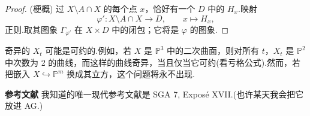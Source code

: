 \begin{proof}
(梗概) 过 $X \setminus A \cap X$ 的每个点 $x$，恰好有一个 $D$ 中的 $H_x$.映射
\[
\varphi' \colon X \setminus A \cap X \to D, \qquad x \mapsto H_x,
\]
正则.取其图象 $\Gamma_{\varphi'}$ 在 $X \times D$ 中的闭包；它将是 $\varphi$ 的图象.
\end{proof}

\begin{remark}\label{rem:31.4}
奇异的 $X_t$ 可能是可约的.例如，若 $X$ 是 $\mathbb{P}^{3}$ 中的二次曲面，则对所有 $t$，$X_t$ 是 $\mathbb{P}^{2}$ 中次数为 2 的曲线，而这样的曲线奇异，当且仅当它可约(看亏格公式).然而，若把嵌入 $X \hookrightarrow \mathbb{P}^{m}$ 换成其立方，这个问题将永不出现.
\end{remark}

\textbf{参考文献} 我知道的唯一现代参考文献是 SGA 7, Expos\'e XVII.(也许某天我会把它放进 AG.)
